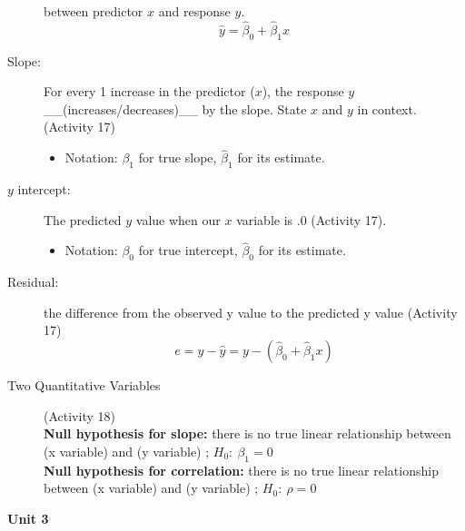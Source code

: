 \begin{description}
       between predictor $x$ and response $y$.
         $$ \widehat{y} = \widehat{\beta}_0 + \widehat{\beta}_1 x$$
     \item [Slope:] For every 1 increase in the
       predictor ($x$),  the  response $y$
       \_\_(increases/decreases)\_\_   by the slope. State
       $x$ and $y$ in context. (Activity 17)
       \begin{itemize}
       \item Notation: $\beta_1$ for true slope, $\widehat{\beta}_1$
         for its estimate. 
       \end{itemize}
     \item [$y$ intercept:]  The predicted $y$ value
       when our $x$ variable is  .$0$      (Activity 17).
       \begin{itemize}
       \item Notation: $\beta_0$ for true intercept, $\widehat{\beta}_0$
         for its estimate. 
       \end{itemize}
     \item [Residual:]   the difference from the observed y value to
       the predicted y value (Activity 17) 
          $$e = y - \widehat{y} = y - (  \widehat{\beta}_0 +
          \widehat{\beta}_1 x)$$
        \item [Two Quantitative Variables] (Activity 18)\\
          {\bf Null hypothesis for slope:} there is no true linear
            relationship between  (x variable)  and  (y variable) ;
            $H_0:\ \beta_1 = 0$  \\
          {\bf Null hypothesis for correlation:} there is no true
            linear relationship between  (x variable)  and  (y
            variable) ; $H_0:\  \rho = 0$  
        \end{description}
\newpage
        
\begin{center}
  {\large\bf Unit 3}
\end{center}

